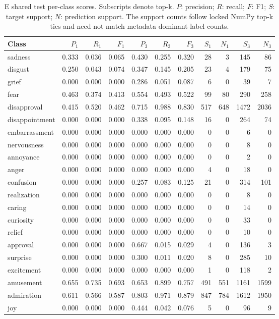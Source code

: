 \begin{table}[!htbp]
\centering
\scriptsize
\setlength{\tabcolsep}{5pt}
\begin{tabular}{lrrrrrrrrrr}
\toprule
Class & $P_1$ & $R_1$ & $F_1$ & $P_3$ & $R_3$ & $F_3$ & $S_1$ & $N_1$ & $S_3$ & $N_3$ \\
\midrule
sadness & 0.333 & 0.036 & 0.065 & 0.430 & 0.255 & 0.320 & 28 & 3 & 145 & 86 \\
disgust & 0.250 & 0.043 & 0.074 & 0.347 & 0.145 & 0.205 & 23 & 4 & 179 & 75 \\
grief & 0.000 & 0.000 & 0.000 & 0.286 & 0.051 & 0.087 & 6 & 0 & 39 & 7 \\
fear & 0.463 & 0.374 & 0.413 & 0.554 & 0.493 & 0.522 & 99 & 80 & 290 & 258 \\
disapproval & 0.415 & 0.520 & 0.462 & 0.715 & 0.988 & 0.830 & 517 & 648 & 1472 & 2036 \\
disappointment & 0.000 & 0.000 & 0.000 & 0.338 & 0.095 & 0.148 & 16 & 0 & 264 & 74 \\
embarrassment & 0.000 & 0.000 & 0.000 & 0.000 & 0.000 & 0.000 & 0 & 0 & 6 & 0 \\
nervousness & 0.000 & 0.000 & 0.000 & 0.000 & 0.000 & 0.000 & 0 & 0 & 8 & 0 \\
annoyance & 0.000 & 0.000 & 0.000 & 0.000 & 0.000 & 0.000 & 0 & 0 & 2 & 0 \\
anger & 0.000 & 0.000 & 0.000 & 0.000 & 0.000 & 0.000 & 4 & 0 & 18 & 0 \\
confusion & 0.000 & 0.000 & 0.000 & 0.257 & 0.083 & 0.125 & 21 & 0 & 314 & 101 \\
realization & 0.000 & 0.000 & 0.000 & 0.000 & 0.000 & 0.000 & 0 & 0 & 8 & 0 \\
caring & 0.000 & 0.000 & 0.000 & 0.000 & 0.000 & 0.000 & 0 & 0 & 14 & 0 \\
curiosity & 0.000 & 0.000 & 0.000 & 0.000 & 0.000 & 0.000 & 0 & 0 & 33 & 0 \\
relief & 0.000 & 0.000 & 0.000 & 0.000 & 0.000 & 0.000 & 0 & 0 & 10 & 0 \\
approval & 0.000 & 0.000 & 0.000 & 0.667 & 0.015 & 0.029 & 4 & 0 & 136 & 3 \\
surprise & 0.000 & 0.000 & 0.000 & 0.300 & 0.011 & 0.020 & 8 & 0 & 285 & 10 \\
excitement & 0.000 & 0.000 & 0.000 & 0.000 & 0.000 & 0.000 & 1 & 0 & 118 & 2 \\
amusement & 0.655 & 0.735 & 0.693 & 0.653 & 0.899 & 0.757 & 491 & 551 & 1161 & 1599 \\
admiration & 0.611 & 0.566 & 0.587 & 0.803 & 0.971 & 0.879 & 847 & 784 & 1612 & 1950 \\
joy & 0.000 & 0.000 & 0.000 & 0.444 & 0.042 & 0.076 & 5 & 0 & 96 & 9 \\
\bottomrule
\end{tabular}
\caption{E shared test per-class scores. Subscripts denote top-k. $P$: precision; $R$: recall; $F$: F1; $S$: target support; $N$: prediction support. The support counts follow locked NumPy top-k ties and need not match metadata dominant-label counts.}
\label{tab:classes-e_shared_query_control}
\end{table}
